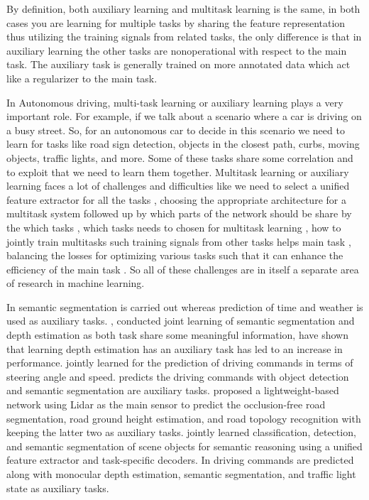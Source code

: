     By definition, both auxiliary learning and multitask learning is the same, in both cases you are learning for multiple tasks by sharing the feature representation thus utilizing the training signals from related tasks, the only difference is that in auxiliary learning the other tasks are nonoperational with respect to the main task. The auxiliary task is generally trained on more annotated data which act like a regularizer to the main task. 
    
    In Autonomous driving, multi-task learning or auxiliary learning plays a very important role. For example, if we talk about a scenario where a car is driving on a busy street. So, for an autonomous car to decide in this scenario we need to learn for tasks like road sign detection, objects in the closest path, curbs, moving objects, traffic lights, and more. Some of these tasks share some correlation and to exploit that we need to learn them together. Multitask learning or auxiliary learning faces a lot of challenges and difficulties like we need to select a unified feature extractor for all the tasks \cite{DBLP:journals/corr/abs-2108-11353}, choosing the appropriate architecture for a multitask system followed up by which parts of the network should be share by the which tasks \cite {Liu_2020_ACCV} \cite{ruder2018latent} \cite{DBLP:journals/corr/abs-1904-02920}, which tasks needs to chosen for multitask learning \cite{DBLP:journals/corr/abs-2110-07301} \cite{DBLP:journals/corr/abs-1904-04153}, how to jointly train multitasks such training signals from other tasks helps main task \cite{DBLP:journals/corr/abs-1903-12117} \cite{DBLP:journals/corr/abs-2007-06889} \cite{DBLP:journals/corr/abs-2001-06782} \cite{Guo_2018_ECCV}, balancing the losses for optimizing various tasks such that it can enhance the efficiency of the main task \cite{DBLP:journals/corr/abs-1904-08492} \cite{pmlr-v80-chen18a} \cite{du2020adapting}. So all of these challenges are in itself a separate area of research in machine learning. 
    
    In \cite{DBLP:journals/corr/abs-1805-06334} semantic segmentation is carried out whereas prediction of time and weather is used as auxiliary tasks. \cite{teichmann2018multinet}, \cite{7785137} conducted joint learning of semantic segmentation and depth estimation as both task share some meaningful information, have shown that learning depth estimation has an auxiliary task has led to an increase in performance. \cite{yang2018endtoend} jointly learned for the prediction of driving commands in terms of steering angle and speed. \cite{Wang2019EndtoEndSU} predicts the driving commands with object detection and semantic segmentation are auxiliary tasks. \cite{9090850} proposed a lightweight-based network using Lidar as the main sensor to predict the occlusion-free road segmentation, road ground height estimation, and road topology recognition with keeping the latter two as auxiliary tasks. \cite{teichmann2018multinet} jointly learned classification, detection, and semantic segmentation of scene objects for semantic reasoning using a unified feature extractor and task-specific decoders. In \cite{9523129} driving commands are predicted along with monocular depth estimation, semantic segmentation, and traffic light state as auxiliary tasks. 
    
